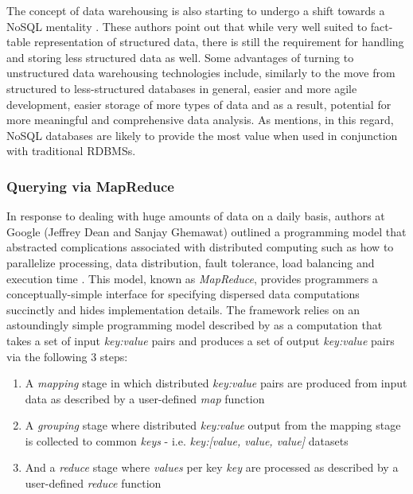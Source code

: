 The concept of data warehousing is also starting to undergo a shift towards a NoSQL mentality \cite{BICEVSKA2017104}. These authors point out that while very well suited to fact-table representation of structured data, there is still the requirement for handling and storing less structured data as well. Some advantages of turning to unstructured data warehousing technologies include, similarly to the move from structured to less-structured databases in general, easier and more agile development, easier storage of more types of data and as a result, potential for more meaningful and comprehensive data analysis. As \cite{BICEVSKA2017104} mentions, in this regard, NoSQL databases are likely to provide the most value when used in conjunction with traditional RDBMSs.

\subsubsection*{Querying via MapReduce}
In response to dealing with huge amounts of data on a daily basis, authors at Google (Jeffrey Dean and Sanjay Ghemawat) outlined a programming model that abstracted complications associated with distributed computing such as how to parallelize processing, data distribution, fault tolerance, load balancing and execution time \cite{Dean:2008}. This model, known as \textit{MapReduce}, provides programmers a conceptually-simple interface for specifying dispersed data computations succinctly and hides implementation details. The framework relies on an astoundingly simple programming model described by \cite{Dean:2008} as a computation that takes a set of input \textit{key:value} pairs and produces a set of output \textit{key:value} pairs via the following 3 steps:

\begin{enumerate}
    \item A \textit{mapping} stage in which distributed \textit{key:value} pairs are produced from input data as described by a user-defined \textit{map} function
    \item A \textit{grouping} stage where distributed \textit{key:value} output from the mapping stage is collected to common \textit{keys} - i.e. \textit{key:[value, value, value]} datasets
    \item And a \textit{reduce} stage where \textit{values} per key \textit{key} are processed as described by a user-defined \textit{reduce} function
\end{enumerate}

